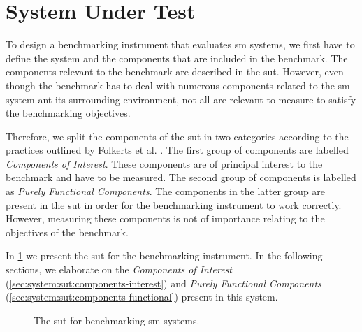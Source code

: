 \section{System Under Test}
\label{sec:system:sut}

To design a benchmarking instrument that evaluates \gls{sm} systems, we first have to define the system and the components that are included in the benchmark. The components relevant to the benchmark are described in the \gls{sut}. However, even though the benchmark has to deal with numerous components related to the \gls{sm} system ant its surrounding environment, not all are relevant to measure to satisfy the benchmarking objectives.

Therefore, we split the components of the \gls{sut} in two categories according to the practices outlined by Folkerts et al. \cite{folkerts2012benchmarking}. The first group of components are labelled \textit{Components of Interest}. These components are of principal interest to the benchmark and have to be measured. The second group of components is labelled as \textit{Purely Functional Components}. The components in the latter group are present in the \gls{sut} in order for the benchmarking instrument to work correctly. However, measuring these components is not of importance relating to the objectives of the benchmark.

In \cref{fig:sut} we present the \gls{sut} for the benchmarking instrument. In the following sections, we elaborate on the  \textit{Components of Interest} (\cref{sec:system:sut:components-interest}) and \textit{Purely Functional Components} (\cref{sec:system:sut:components-functional})  present in this system.

\begin{figure}[!t]
    \centering
    
    
    \caption{The \gls{sut} for benchmarking \gls{sm} systems.}
    
    \label{fig:sut}
\end{figure}

